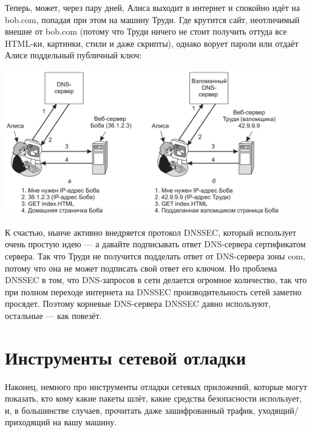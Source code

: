 \documentclass{../mcstext}
\begin{document}
Теперь, может, через пару дней, Алиса выходит в интернет и спокойно идёт на bob.com, попадая при этом на машину Труди. Где крутится сайт, неотличимый внешне от bob.com (потому что Труди ничего не стоит получить оттуда все HTML-ки, картинки, стили и даже скрипты), однако ворует пароли или отдаёт Алисе поддельный публичный ключ:

\begin{center}
    \includegraphics[width=0.9\textwidth]{dnsSpoofingResult.png}
\end{center}

К счастью, нынче активно внедряется протокол DNSSEC, который использует очень простую идею --- а давайте подписывать ответ DNS-сервера сертификатом сервера. Так что Труди не получится подделать ответ от DNS-сервера зоны com, потому что она не может подписать свой ответ его ключом. Но проблема DNSSEC в том, что DNS-запросов в сети делается огромное количество, так что при полном переходе интернета на DNSSEC производительность сетей заметно просядет. Поэтому корневые DNS-сервера DNSSEC давно используют, остальные --- как повезёт.

\section{Инструменты сетевой отладки}

Наконец, немного про инструменты отладки сетевых приложений, которые могут показать, кто кому какие пакеты шлёт, какие средства безопасности использует, и, в большинстве случаев, прочитать даже зашифрованный трафик, уходящий/приходящий на вашу машину. 
\end{document}
